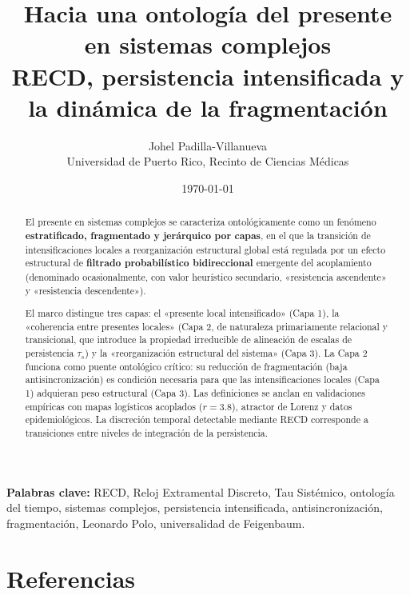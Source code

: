 \documentclass[11pt,a4paper]{article}
\title{\textbf{Hacia una ontología del presente en sistemas complejos}\\[0.3em]
\large RECD, persistencia intensificada y la dinámica de la fragmentación}
\author{Johel Padilla-Villanueva\\
\small Universidad de Puerto Rico, Recinto de Ciencias Médicas}
\date{\today}
\begin{document}
\maketitle

\begin{abstract}
El presente en sistemas complejos se caracteriza ontológicamente como un fenómeno \textbf{estratificado, fragmentado y jerárquico por capas}, en el que la transición de intensificaciones locales a reorganización estructural global está regulada por un efecto estructural de \textbf{filtrado probabilístico bidireccional} emergente del acoplamiento (denominado ocasionalmente, con valor heurístico secundario, «resistencia ascendente» y «resistencia descendente»).

El marco distingue tres capas: el «presente local intensificado» (Capa 1), la «coherencia entre presentes locales» (Capa 2, de naturaleza primariamente relacional y transicional, que introduce la propiedad irreducible de alineación de escalas de persistencia $\tau_s$) y la «reorganización estructural del sistema» (Capa 3). La Capa 2 funciona como puente ontológico crítico: su reducción de fragmentación (baja antisincronización) es condición necesaria para que las intensificaciones locales (Capa 1) adquieran peso estructural (Capa 3). Las definiciones se anclan en validaciones empíricas con mapas logísticos acoplados ($r=3.8$), atractor de Lorenz y datos epidemiológicos. La discreción temporal detectable mediante RECD corresponde a transiciones entre niveles de integración de la persistencia.
\end{abstract}

\noindent\textbf{Palabras clave:} RECD, Reloj Extramental Discreto, Tau Sistémico, ontología del tiempo, sistemas complejos, persistencia intensificada, antisincronización, fragmentación, Leonardo Polo, universalidad de Feigenbaum.

\newpage
\tableofcontents
\newpage










\section*{Referencias}

\sloppy

\normalfont
\end{document}
